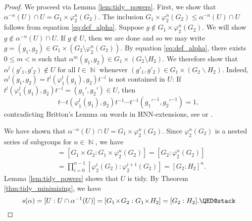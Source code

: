 \documentclass{article}
\DeclareMathOperator\bbN{\mathbb{N}}
\theoremstyle{definition}
\begin{document}
\begin{proof}
We proceed via Lemma \ref{lem:tidy_powers}. First, we show that $\alpha^{-n}(U)\!\cap\! U\! =\! G_1\!\times\!\varphi_2^{n}(G_2)$. The inclusion $ G_1\times \varphi_2^{n}(G_2)\le \alpha^{-n}(U)\cap U$ follows from equation \eqref{eq:def_alpha}. Suppose $g\not\in G_1\times \varphi_2^{n}(G_2)$. We will show $g\not\in \alpha^{-n}(U)\cap U$. If $g\not\in U$, then we are done and so we may write $g = (g_1,g_2)\in G_1\times (G_2\setminus \varphi_2^{n}(G_2))$. By equation \eqref{eq:def_alpha}, there exists $0\le m < n$ such that $\alpha^{m}(g_1,g_2)\in G_1\times (G_2\setminus H_2)$. We therefore show that $\alpha^{l}(g'_{1},g'_{2})\not\in U$ for all $l\in\bbN$ whenever $(g'_1,g'_{2})\in G_1\times( G_{2}\backslash H_{2})$. Indeed, $\alpha^{l}(g_{1},g_{2})=t^{l}(\varphi_{1}^{l}(g_{1}),g_{2})t^{-l}$ is not contained in $U$: If $t^{l}(\varphi_{1}^{l}(g_{1}),g_{2})t^{-l}=(g_{1}',g_{2}')\in U$, then
\begin{displaymath}
t\cdots t(\varphi_{1}^{l}(g_{1}),g_{2})t^{-1}\cdots t^{-1}(g_{1}'^{-1},g_{2}'^{-1})=1, 
\end{displaymath}
contradicting Britton's Lemma on words in HNN-extensions, see \cite[Lemma 4]{Bri63} or \cite[Theorem 2.1]{LS15}.

We have shown that $\alpha^{-n}(U)\cap U = G_1\times \varphi_2^{n}(G_2)$. Since $\varphi_2^{n}(G_2)$ is a nested series of subgroups for $n\in\bbN$, we have
\begin{align*}
[U:U\cap \alpha^{-n}(U)] &= [G_1\times G_2:G_1\times \varphi_2^{n}(G_2)] = [G_2:\varphi_2^{n}(G_2)]\\ 
&= \prod_{i = 0}^{n - 1}[\varphi_2^{i}(G_2):\varphi_{2}^{i+1}(G_2)] = [G_2:H_2]^{n}.
\end{align*}
Lemma \ref{lem:tidy_powers} shows that $U$ is tidy. By Theorem \ref{thm:tidy_minimizing}, we have
\begin{displaymath}
  s(\alpha)=[U:U\cap\alpha^{-1}(U)]=[G_{1}\!\times\! G_{2}:G_{1}\!\times\! H_{2}]=[G_{2}:H_{2}]. \qedhere
\end{displaymath}
\end{proof}



\end{document}

